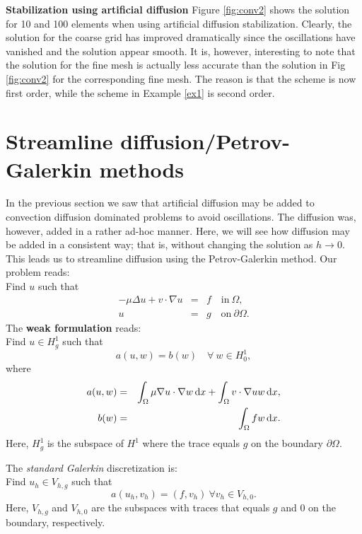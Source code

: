 \begin{example}{\textbf{Stabilization using artificial diffusion}}
Figure \ref{fig:conv2} shows the solution for 10 and 100 elements when using artificial diffusion 
stabilization.  Clearly, the solution for the coarse grid has improved dramatically since the
oscillations have vanished and the solution appear smooth. It is, however, interesting to note
that the solution for the fine mesh is actually less accurate than the solution in Fig \ref{fig:conv2} 
for the corresponding fine mesh. The reason is that the scheme is now first order, while the 
scheme in Example \ref{ex1} is second order.    
\end{example}



\section{Streamline diffusion/Petrov-Galerkin methods}
In the previous section we saw that artificial diffusion may be added to convection diffusion dominated problems to avoid 
oscillations. The diffusion was, however, added in a rather ad-hoc manner.  
Here, we will see how diffusion may be added in a consistent way; 
that is, without changing the solution as $h\rightarrow 0$. 
This leads us to streamline diffusion using the Petrov-Galerkin method.
Our problem reads: \\ 
Find $u$ such that 
\begin{eqnarray*}
-\mu\Delta u + v\cdot\nabla u &=& f \quad \textrm{in}\ \Omega, \\
u&=& g \quad \textrm{on}\ \partial\Omega .
\end{eqnarray*}
The \textbf{weak formulation} reads: \\
Find $u\in H_g^1$ such that 
\[
a(u,w) = b(w) \quad \forall\ w\in H_0^1, 
\]
where
\begin{eqnarray*}
a(u,w) &=& \int_\Omega\mu\nabla u \cdot \nabla w \, \mathrm{d}x + \int_\Omega v \cdot \nabla uw \, \mathrm{d}x,   \\
b(w) &=& \int_\Omega fw \, \mathrm{d}x . 
\end{eqnarray*}
Here, $H_g^1$ is the subspace of $H^1$ where the trace equals $g$ on the boundary $\partial \Omega$.  

The \textit{standard Galerkin} discretization is: \\
Find $u_h\in V_{h,g}$ such that 
\begin{equation}
\label{Galerkin}
a(u_h, v_h) = (f,v_h)\ \forall v_h\in V_{h,0}.
\end{equation}
Here, $V_{h,g}$  and $V_{h,0}$ are the subspaces with traces that equals $g$ and $0$ on 
the boundary, respectively.  

